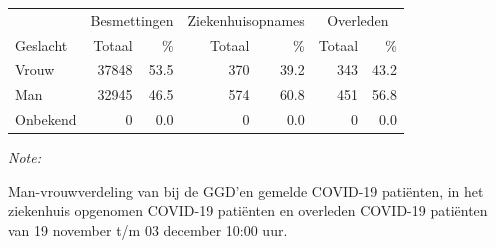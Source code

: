 \documentclass[
  english,
  man,floatsintext]{apa6}
\begin{document}
\begin{table}[H]
\centering\begingroup\fontsize{11}{13}\selectfont

\begin{threeparttable}
\begin{tabular}{lrrrrrr}
\toprule
\multicolumn{1}{c}{ } & \multicolumn{2}{c}{Besmettingen} & \multicolumn{2}{c}{Ziekenhuisopnames} & \multicolumn{2}{c}{Overleden} \\
\cmidrule(l{3pt}r{3pt}){2-3} \cmidrule(l{3pt}r{3pt}){4-5} \cmidrule(l{3pt}r{3pt}){6-7}
Geslacht & Totaal & \% & Totaal & \% & Totaal & \%\\
\midrule
Vrouw & 37848 & 53.5 & 370 & 39.2 & 343 & 43.2\\
Man & 32945 & 46.5 & 574 & 60.8 & 451 & 56.8\\
Onbekend & 0 & 0.0 & 0 & 0.0 & 0 & 0.0\\
\bottomrule
\end{tabular}
\begin{tablenotes}
\item \textit{Note: } 
\item Man-vrouwverdeling van bij de GGD’en gemelde COVID-19 patiënten, in het ziekenhuis opgenomen COVID-19 patiënten en overleden COVID-19 patiënten van 19 november t/m 03 december 10:00 uur.
\end{tablenotes}
\end{threeparttable}
\endgroup{}
\end{table}
\newpage
\end{document}
